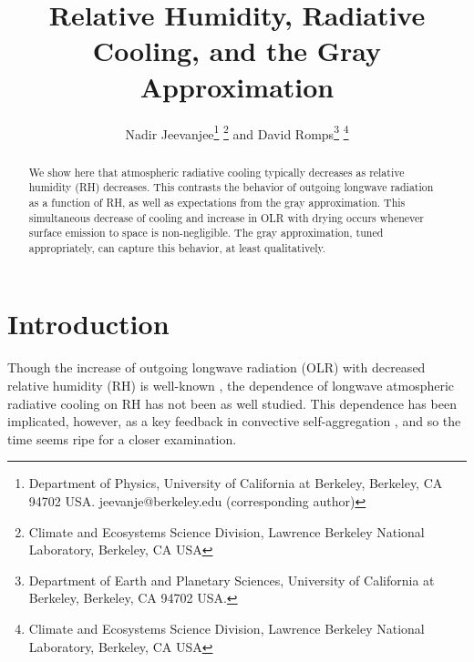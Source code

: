 \documentclass[10pt]{article}
\begin{document}
%
%


\title{Relative Humidity, Radiative Cooling, and the Gray Approximation}

%
%


 \author{Nadir Jeevanjee\footnote{Department of Physics, University of California at Berkeley, Berkeley, CA 94702  USA. jeevanje@berkeley.edu (corresponding author)} \footnote{Climate and Ecosystems Science Division, Lawrence Berkeley National Laboratory, Berkeley, CA USA} and David Romps\footnote{Department of Earth and Planetary Sciences, University of California at Berkeley, Berkeley, CA 94702  USA.} \footnote{Climate and Ecosystems Science Division, Lawrence Berkeley National Laboratory, Berkeley, CA USA}
}

\maketitle

\begin{abstract}
We show here that atmospheric radiative cooling typically decreases as relative humidity (RH) decreases. This contrasts the behavior of outgoing longwave radiation as a function of RH, as well as expectations from the gray approximation. This simultaneous decrease of cooling and increase in OLR with drying occurs whenever surface emission to space is non-negligible. The gray approximation, tuned appropriately, can capture this behavior, at least qualitatively.


%
%
\end{abstract}


%
%


\section {Introduction}
Though the increase of outgoing longwave radiation (OLR) with decreased relative humidity (RH) is well-known \citep{pierrehumbert2010}, the dependence of longwave atmospheric radiative cooling on RH has not been as well studied. This dependence has been implicated, however, as a key feedback in convective self-aggregation \citep[e.g.][]{muller2015, emanuel2014,wing2014}, and so the time seems ripe for a closer examination. 
\end{document}
